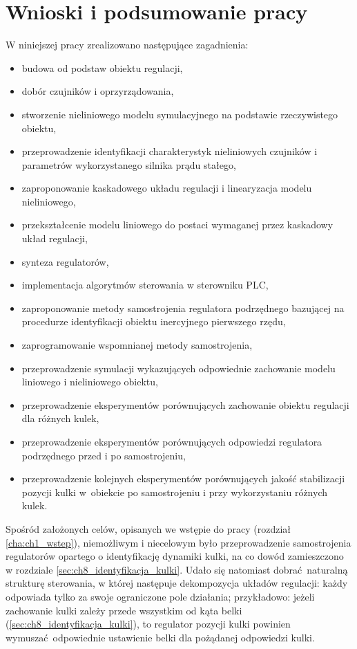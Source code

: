 \chapter{Wnioski i podsumowanie pracy}
\label{cha:ch10_wnioski}

W niniejszej pracy zrealizowano następujące zagadnienia:
\begin{itemize}
    \item budowa od podstaw obiektu regulacji,
    \item dobór czujników i oprzyrządowania,
    \item stworzenie nieliniowego modelu symulacyjnego na podstawie rzeczywistego obiektu,
    \item przeprowadzenie identyfikacji charakterystyk nieliniowych czujników i parametrów wykorzystanego silnika prądu stałego,
    \item zaproponowanie kaskadowego układu regulacji i linearyzacja modelu nieliniowego,
    \item przekształcenie modelu liniowego do postaci wymaganej przez kaskadowy układ regulacji,
    \item synteza regulatorów,
    \item implementacja algorytmów sterowania w sterowniku PLC,
    \item zaproponowanie metody samostrojenia regulatora podrzędnego bazującej na procedurze identyfikacji obiektu inercyjnego pierwszego rzędu,
    \item zaprogramowanie wspomnianej metody samostrojenia,
    \item przeprowadzenie symulacji wykazujących odpowiednie zachowanie modelu liniowego i nieliniowego obiektu,
    \item przeprowadzenie eksperymentów porównujących zachowanie obiektu regulacji dla różnych kulek,
    \item przeprowadzenie eksperymentów porównujących odpowiedzi regulatora podrzędnego przed i po samostrojeniu,
    \item przeprowadzenie kolejnych eksperymentów porównujących jakość stabilizacji pozycji kulki w~obiekcie po samostrojeniu i przy wykorzystaniu różnych kulek.
\end{itemize}

Spośród założonych celów, opisanych we wstępie do pracy (rozdział \ref{cha:ch1_wstep}), niemożliwym i niecelowym było przeprowadzenie samostrojenia regulatorów opartego o identyfikację dynamiki kulki, na co dowód zamieszczono w rozdziale \ref{sec:ch8_identyfikacja_kulki}. Udało się natomiast dobrać naturalną strukturę sterowania, w której następuje dekompozycja układów regulacji: każdy odpowiada tylko za swoje ograniczone pole działania; przykładowo: jeżeli zachowanie kulki zależy przede wszystkim od kąta belki (\ref{sec:ch8_identyfikacja_kulki}), to regulator pozycji kulki powinien wymuszać odpowiednie ustawienie belki dla pożądanej odpowiedzi kulki.

